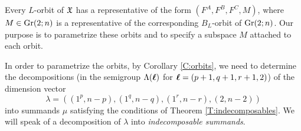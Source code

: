 \documentclass[12pt,reqno]{amsart}
\begin{document}
Every $L$-orbit of $\mathfrak{X}$ has a representative of the form $(F^A,F^B,F^C,M)$, where $M\in\mathrm{Gr}(2;n)$
is a representative of the corresponding $B_L$-orbit of $\mathrm{Gr}(2;n)$. Our purpose is to parametrize these orbits and to specify a subspace $M$ attached to each orbit.

In order to parametrize the orbits, by Corollary \ref{C:orbits}, we need to determine the decompositions (in the semigroup $\Lambda(\boldsymbol{\ell})$ for $\boldsymbol{\ell}=(p+1,q+1,r+1,2)$) of the dimension vector
\begin{equation} \label{dimension.vector:lambda}
\lambda=((1^p,n-p),(1^q,n-q),(1^r,n-r),(2,n-2))
\end{equation}
into summands $\mu$ satisfying the conditions of Theorem \ref{T:indecomposables}.
We will speak of a decomposition of $\lambda$ into {\em indecomposable summands}.
\end{document}
